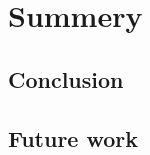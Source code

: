 \chapter{Summery}
\label{cha:summery}
\section{Conclusion}
\label{sec:summery:conclusion}
\section{Future work}
\label{sec:summery:future-work}

